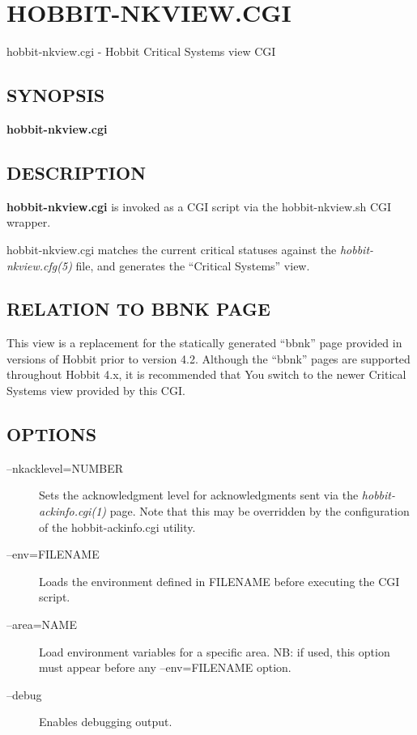 %
%
\newpage
\section{HOBBIT-NKVIEW.CGI}

hobbit-nkview.cgi - Hobbit Critical Systems view CGI

 \subsection{SYNOPSIS}
\textbf{hobbit-nkview.cgi}


 
\subsection{DESCRIPTION}
\textbf{hobbit-nkview.cgi}
 is invoked as a CGI script via the hobbit-nkview.sh CGI wrapper. 

  hobbit-nkview.cgi matches the current critical statuses against the \emph{hobbit-nkview.cfg(5)}
 file, and generates the ``Critical Systems'' view. 


 
\subsection{RELATION TO BBNK PAGE}
 This view is a replacement for the statically generated ``bbnk'' page
 provided in versions of Hobbit prior to version 4.2. Although the
 ``bbnk'' pages are supported throughout Hobbit 4.x, it is recommended
 that You switch to the newer Critical Systems view provided by this
 CGI. 


 
\subsection{OPTIONS}
\begin{description}
\item[--nkacklevel=NUMBER] Sets the acknowledgment level for
  acknowledgments sent via the \emph{hobbit-ackinfo.cgi(1)} page. Note
  that this may be overridden by the configuration of the
  hobbit-ackinfo.cgi utility. 


 

\item[--env=FILENAME] Loads the environment defined in FILENAME before
  executing the CGI script. 


 

\item[--area=NAME] Load environment variables for a specific area. NB:
  if used, this option must appear before any --env=FILENAME option. 


 

\item[--debug] Enables debugging output. 

 


\end{description}
